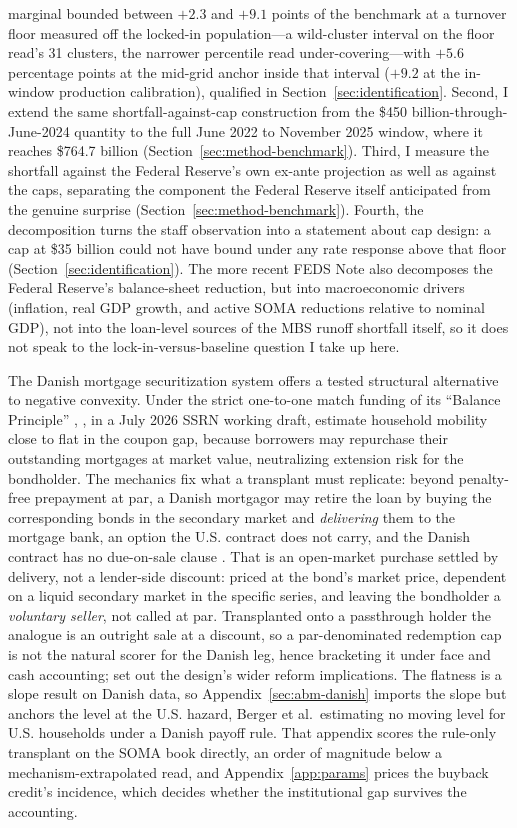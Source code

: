 marginal bounded between $+2.3$ and $+9.1$ points of the benchmark at a turnover floor measured off the locked-in population---a wild-cluster interval on the floor read's 31 clusters, the narrower percentile read under-covering---with $+5.6$ percentage points at the mid-grid anchor inside that interval ($+9.2$ at the in-window production calibration), qualified in Section~\ref{sec:identification}. Second, I extend the same shortfall-against-cap construction from the \$450 billion-through-June-2024 quantity to the full June 2022 to November 2025 window, where it reaches \$764.7 billion (Section~\ref{sec:method-benchmark}). Third, I measure the shortfall against the Federal Reserve's own ex-ante projection as well as against the caps, separating the component the Federal Reserve itself anticipated from the genuine surprise (Section~\ref{sec:method-benchmark}). Fourth, the decomposition turns the staff observation into a statement about cap design: a cap at \$35 billion could not have bound under any rate response above that floor (Section~\ref{sec:identification}). The more recent \citet{eyal2026} FEDS Note also decomposes the Federal Reserve's balance-sheet reduction, but into macroeconomic drivers (inflation, real GDP growth, and active SOMA reductions relative to nominal GDP), not into the loan-level sources of the MBS runoff shortfall itself, so it does not speak to the lock-in-versus-baseline question I take up here.

The Danish mortgage securitization system offers a tested structural alternative to negative convexity. Under the strict one-to-one match funding of its ``Balance Principle'' \citep{berg2018}, \citet[\S3.3.2]{berger2026}, in a July 2026 SSRN working draft, estimate household mobility close to flat in the coupon gap, because borrowers may repurchase their outstanding mortgages at market value, neutralizing extension risk for the bondholder. The mechanics fix what a transplant must replicate: beyond penalty-free prepayment at par, a Danish mortgagor may retire the loan by buying the corresponding bonds in the secondary market and \emph{delivering} them to the mortgage bank, an option the U.S. contract does not carry, and the Danish contract has no due-on-sale clause \citep{frankel2004}. That is an open-market purchase settled by delivery, not a lender-side discount: priced at the bond's market price, dependent on a liquid secondary market in the specific series, and leaving the bondholder a \emph{voluntary seller}, not called at par. Transplanted onto a passthrough holder the analogue is an outright sale at a discount, so a par-denominated redemption cap is not the natural scorer for the Danish leg, hence bracketing it under face and cash accounting; \citet{svenstrup2006} set out the design's wider reform implications. The flatness is a slope result on Danish data, so Appendix~\ref{sec:abm-danish} imports the slope but anchors the level at the U.S. hazard, Berger et al.\ estimating no moving level for U.S. households under a Danish payoff rule. That appendix scores the rule-only transplant on the SOMA book directly, an order of magnitude below a mechanism-extrapolated read, and Appendix~\ref{app:params} prices the buyback credit's incidence, which decides whether the institutional gap survives the accounting.

